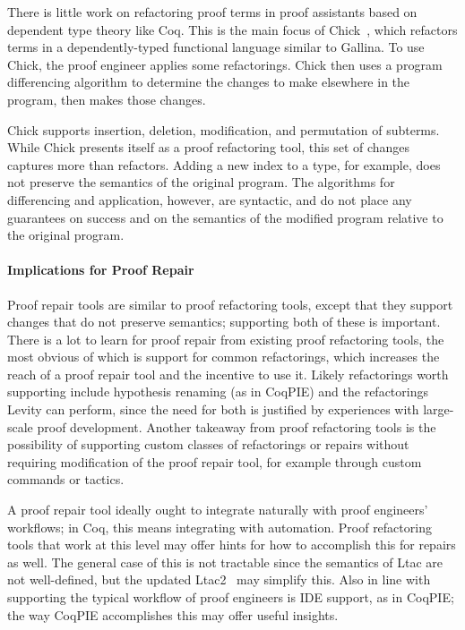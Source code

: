 There is little work on refactoring proof terms in proof assistants based on dependent type theory like Coq.
This is the main focus of Chick~\cite{robert2018front}, which refactors terms in a dependently-typed functional language
similar to Gallina. To use Chick, the proof engineer applies some refactorings.
Chick then uses a program differencing algorithm to determine the changes to make elsewhere in the program,
then makes those changes.

Chick supports insertion, deletion, modification, and permutation of subterms.
While Chick presents itself as a proof refactoring tool,
this set of changes captures more than refactors.
Adding a new index to a type, for example, does not preserve the semantics of the original program.
The algorithms for differencing and application, however, are syntactic, and do not place any guarantees on
success and on the semantics of the modified program relative to the original program.

\paragraph{Implications for Proof Repair}

Proof repair tools are similar to proof refactoring tools,
except that they support changes that do not preserve semantics; supporting
both of these is important. There is a lot to learn for proof repair from existing proof refactoring tools,
the most obvious of which is support for common
refactorings, which increases the reach of a proof repair tool and the incentive to use it.
Likely refactorings worth supporting include hypothesis renaming (as in CoqPIE) and the refactorings Levity can perform, since
the need for both is justified by experiences with large-scale proof development.
Another takeaway from proof refactoring tools is the possibility of supporting custom classes of refactorings or
repairs without requiring modification of the proof repair tool,
for example through custom commands or tactics.

A proof repair tool ideally ought to integrate naturally with proof engineers' workflows;
in Coq, this means integrating with automation.
Proof refactoring tools that work at this level may offer hints for how to accomplish this for repairs as well.
The general case of this is not tractable since the semantics of Ltac are not well-defined,
but the updated Ltac2~\cite{ltac2}
may simplify this.
Also in line with supporting the typical workflow of proof engineers is IDE support,
as in CoqPIE; the way CoqPIE accomplishes this %
may offer useful insights.

